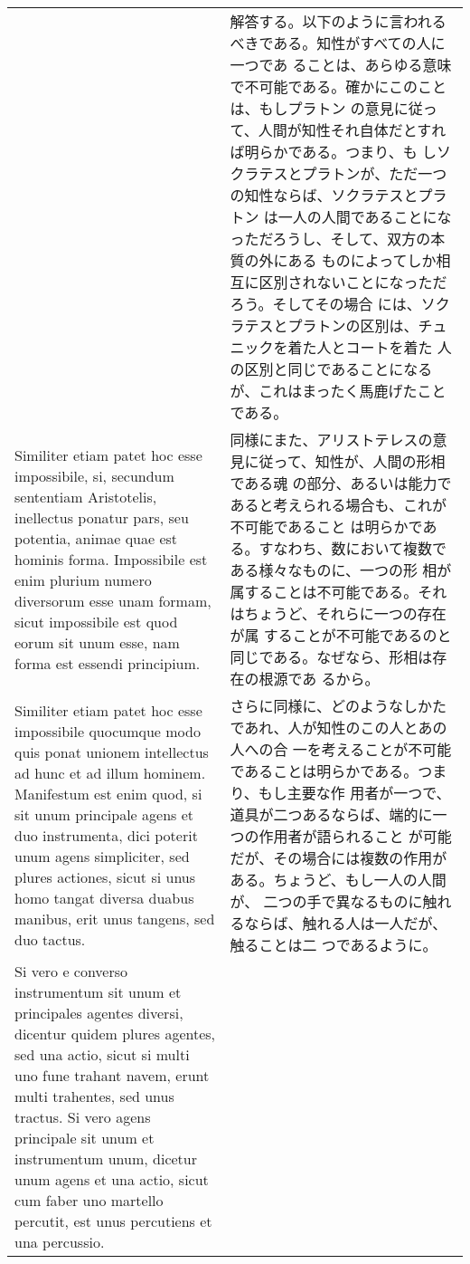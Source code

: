 \documentclass[paper=a4paper,fontsize=10pt,jafontsize=9pt,titlepage]{jlreq}
\begin{document}
\begin{longtable}{p{21em}p{21em}}
&

 解答する。以下のように言われるべきである。知性がすべての人に一つであ
 ることは、あらゆる意味で不可能である。確かにこのことは、もしプラトン
 の意見に従って、人間が知性それ自体だとすれば明らかである。つまり、も
 しソクラテスとプラトンが、ただ一つの知性ならば、ソクラテスとプラトン
 は一人の人間であることになっただろうし、そして、双方の本質の外にある
 ものによってしか相互に区別されないことになっただろう。そしてその場合
 には、ソクラテスとプラトンの区別は、チュニックを着た人とコートを着た
 人の区別と同じであることになるが、これはまったく馬鹿げたことである。
 
\\



 Similiter etiam patet hoc esse impossibile, si, secundum sententiam
 Aristotelis, inellectus ponatur pars, seu potentia, animae quae est
 hominis forma. Impossibile est enim plurium numero diversorum esse
 unam formam, sicut impossibile est quod eorum sit unum esse, nam
 forma est essendi principium.

&

 同様にまた、アリストテレスの意見に従って、知性が、人間の形相である魂
 の部分、あるいは能力であると考えられる場合も、これが不可能であること
 は明らかである。すなわち、数において複数である様々なものに、一つの形
 相が属することは不可能である。それはちょうど、それらに一つの存在が属
 することが不可能であるのと同じである。なぜなら、形相は存在の根源であ
 るから。


 \\


 Similiter etiam patet hoc esse impossibile quocumque modo quis ponat
 unionem intellectus ad hunc et ad illum hominem. Manifestum est enim
 quod, si sit unum principale agens et duo instrumenta, dici poterit
 unum agens simpliciter, sed plures actiones, sicut si unus homo
 tangat diversa duabus manibus, erit unus tangens, sed duo tactus.

&

 さらに同様に、どのようなしかたであれ、人が知性のこの人とあの人への合
 一を考えることが不可能であることは明らかである。つまり、もし主要な作
 用者が一つで、道具が二つあるならば、端的に一つの作用者が語られること
 が可能だが、その場合には複数の作用がある。ちょうど、もし一人の人間が、
 二つの手で異なるものに触れるならば、触れる人は一人だが、触ることは二
 つであるように。
\\


 Si vero e converso instrumentum sit unum et principales agentes
 diversi, dicentur quidem plures agentes, sed una actio, sicut si
 multi uno fune trahant navem, erunt multi trahentes, sed unus
 tractus. Si vero agens principale sit unum et instrumentum unum,
 dicetur unum agens et una actio, sicut cum faber uno martello
 percutit, est unus percutiens et una percussio.


\end{longtable}
\end{document}
